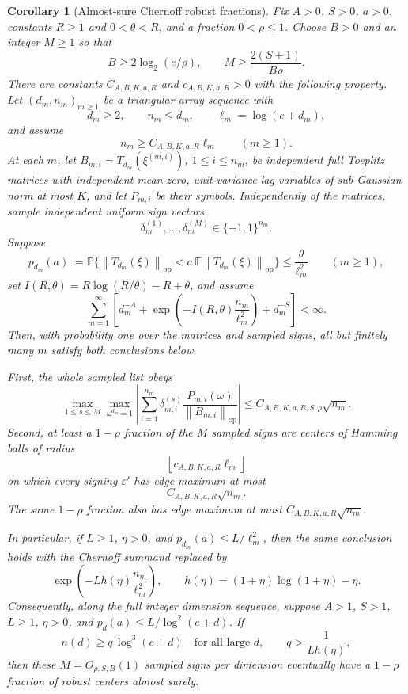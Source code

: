 \documentclass[11pt]{amsart}
\numberwithin{equation}{section}
\newtheorem{corollary}[theorem]{Corollary}
\theoremstyle{definition}
\theoremstyle{remark}
\newcommand{\op}{\mathrm{op}}
\newcommand{\Prob}{\mathbb P}
\newcommand{\Exp}{\mathbb E}
\newcommand{\norm}[1]{\left\lVert #1\right\rVert}
\newcommand{\eps}{\varepsilon}
\begin{document}
\begin{corollary}[Almost-sure Chernoff robust fractions]
\label{cor:normalizer-tail-chernoff-borel-fractions}
Fix \(A>0\), \(S>0\), \(a>0\), constants \(R\ge1\) and \(0<\theta<R\), and a
fraction \(0<\rho\le1\).  Choose \(B>0\) and an integer \(M\ge1\) so that
\[
  B\ge 2\log_2(e/\rho),
  \qquad
  M\ge \frac{2(S+1)}{B\rho}.
\]
There are constants \(C_{A,B,K,a,R}\) and \(c_{A,B,K,a,R}>0\) with the following
property.  Let \((d_m,n_m)_{m\ge1}\) be a triangular-array sequence with
\[
  d_m\ge2,\qquad n_m\le d_m,\qquad
  \ell_m=\log(e+d_m),
\]
and assume
\[
  n_m\ge C_{A,B,K,a,R}\ell_m \qquad(m\ge1).
\]
At each \(m\), let \(B_{m,i}=T_{d_m}(\xi^{(m,i)})\), \(1\le i\le n_m\), be
independent full Toeplitz matrices with independent mean-zero, unit-variance
lag variables of sub-Gaussian norm at most \(K\), and let \(P_{m,i}\) be their
symbols.  Independently of the matrices, sample independent uniform sign
vectors
\[
  \delta_m^{(1)},\ldots,\delta_m^{(M)}\in\{-1,1\}^{n_m}.
\]
Suppose
\[
  p_{d_m}(a):=
  \Prob\{\norm{T_{d_m}(\xi)}_{\op}
      <a\,\Exp\norm{T_{d_m}(\xi)}_{\op}\}
  \le \frac{\theta}{\ell_m^2}
  \qquad(m\ge1),
\]
set \(I(R,\theta)=R\log(R/\theta)-R+\theta\), and assume
\[
  \sum_{m=1}^\infty
  \left[
  d_m^{-A}
  +\exp\left(-I(R,\theta)\frac{n_m}{\ell_m^2}\right)
  +d_m^{-S}
  \right]<\infty .
\]
Then, with probability one over the matrices and sampled signs, all but
finitely many \(m\) satisfy both conclusions below.

First, the whole sampled list obeys
\[
  \max_{1\le s\le M}\max_{\omega^{d_m}=1}
  \left|\sum_{i=1}^{n_m}\delta_{m,i}^{(s)}
  \frac{P_{m,i}(\omega)}{\norm{B_{m,i}}_{\op}}\right|
  \le C_{A,B,K,a,R,S,\rho}\sqrt{n_m}.
\]
Second, at least a \(1-\rho\) fraction of the \(M\) sampled signs are centers of
Hamming balls of radius
\[
  \left\lfloor c_{A,B,K,a,R}\ell_m\right\rfloor
\]
on which every signing \(\eps'\) has edge maximum at most
\[
  C_{A,B,K,a,R}\sqrt{n_m}.
\]
The same \(1-\rho\) fraction also has edge maximum at most
\(C_{A,B,K,a,R}\sqrt{n_m}\).

In particular, if \(L\ge1\), \(\eta>0\), and
\(p_{d_m}(a)\le L/\ell_m^2\), then the same conclusion holds with the Chernoff
summand replaced by
\[
  \exp\left(-Lh(\eta)\frac{n_m}{\ell_m^2}\right),
  \qquad h(\eta)=(1+\eta)\log(1+\eta)-\eta .
\]
Consequently, along the full integer dimension sequence, suppose \(A>1\),
\(S>1\), \(L\ge1\), \(\eta>0\), and \(p_d(a)\le L/\log^2(e+d)\).  If
\[
  n(d)\ge q\,\log^3(e+d)
  \quad\text{for all large }d,\qquad
  q>\frac1{Lh(\eta)},
\]
then these \(M=O_{\rho,S,B}(1)\) sampled signs per dimension eventually have a
\(1-\rho\) fraction of robust centers almost surely.
\end{corollary}
\end{document}
